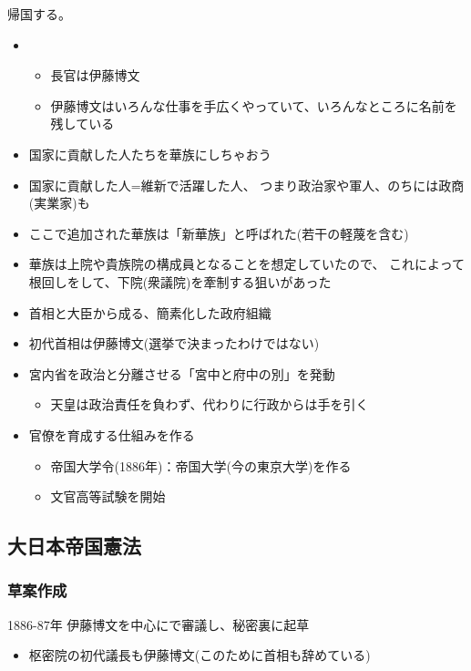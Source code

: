 \documentclass[12pt,fleqn]{ltjsarticle}
\begin{document}
 帰国する。
\begin{itemize}
\item {}
\begin{itemize}
\item 長官は伊藤博文
\item 伊藤博文はいろんな仕事を手広くやっていて、いろんなところに名前を残している
\end{itemize}
\end{itemize}

\begin{itemize}
\item 国家に貢献した人たちを華族にしちゃおう
\item 国家に貢献した人=維新で活躍した人、
つまり政治家や軍人、のちには政商(実業家)も
\item ここで追加された華族は「新華族」と呼ばれた(若干の軽蔑を含む)
\item 華族は上院や貴族院の構成員となることを想定していたので、
これによって根回しをして、下院(衆議院)を牽制する狙いがあった
\end{itemize}

\begin{itemize}
\item 首相と大臣から成る、簡素化した政府組織
\item 初代首相は伊藤博文(選挙で決まったわけではない)
\item 宮内省を政治と分離させる「宮中と府中の別」を発動
\begin{itemize}
\item 天皇は政治責任を負わず、代わりに行政からは手を引く
\end{itemize}
\item 官僚を育成する仕組みを作る
\begin{itemize}
\item 帝国大学令(1886年)：帝国大学(今の東京大学)を作る
\item 文官高等試験を開始
\end{itemize}
\end{itemize}

\subsection{大日本帝国憲法}
\subsubsection{草案作成}
1886-87年 伊藤博文を中心にで審議し、秘密裏に起草
\begin{itemize}
\item 枢密院の初代議長も伊藤博文(このために首相も辞めている)
\end{itemize}
\end{document}
